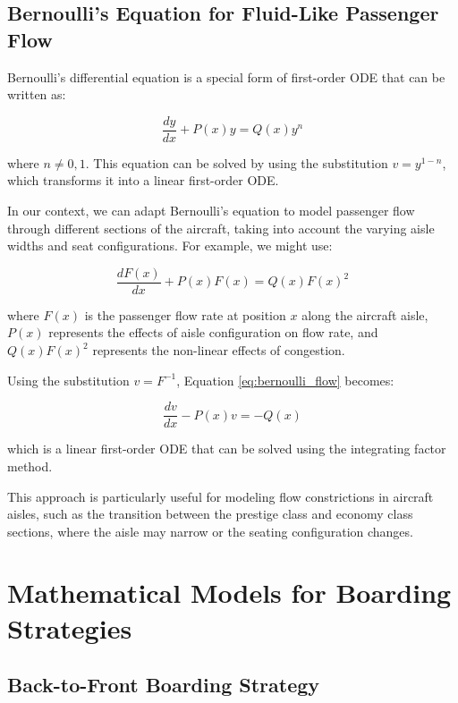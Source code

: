 \documentclass[12pt,a4paper]{article}
\begin{document}
\subsection{Bernoulli's Equation for Fluid-Like Passenger Flow}

Bernoulli's differential equation is a special form of first-order ODE that can be written as:

\begin{equation}
\frac{dy}{dx} + P(x)y = Q(x)y^n
\label{eq:bernoulli}
\end{equation}

where $n \neq 0, 1$. This equation can be solved by using the substitution $v = y^{1-n}$, which transforms it into a linear first-order ODE.

In our context, we can adapt Bernoulli's equation to model passenger flow through different sections of the aircraft, taking into account the varying aisle widths and seat configurations. For example, we might use:

\begin{equation}
\frac{dF(x)}{dx} + P(x)F(x) = Q(x)F(x)^2
\label{eq:bernoulli_flow}
\end{equation}

where $F(x)$ is the passenger flow rate at position $x$ along the aircraft aisle, $P(x)$ represents the effects of aisle configuration on flow rate, and $Q(x)F(x)^2$ represents the non-linear effects of congestion.

Using the substitution $v = F^{-1}$, Equation \ref{eq:bernoulli_flow} becomes:

\begin{equation}
\frac{dv}{dx} - P(x)v = -Q(x)
\label{eq:transformed_bernoulli}
\end{equation}

which is a linear first-order ODE that can be solved using the integrating factor method.

This approach is particularly useful for modeling flow constrictions in aircraft aisles, such as the transition between the prestige class and economy class sections, where the aisle may narrow or the seating configuration changes.

\section{Mathematical Models for Boarding Strategies}
\subsection{Back-to-Front Boarding Strategy}
\end{document}
